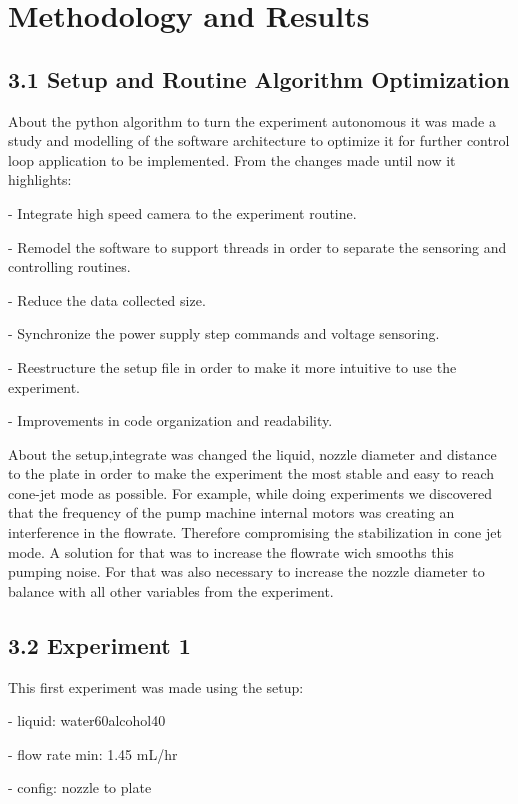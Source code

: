 \section{Methodology and Results}

\subsection*{3.1 Setup and Routine Algorithm Optimization}

    About the python algorithm to turn the experiment autonomous it was made a study and modelling of the software architecture to optimize it 
    for further control loop application to be implemented.
    From the changes made until now it highlights:

    - Integrate high speed camera to the experiment routine.

    - Remodel the software to support threads in order to separate the sensoring and controlling routines.

    - Reduce the data collected size. 

    - Synchronize the power supply step commands and voltage sensoring. 

    - Reestructure the setup file in order to make it more intuitive to use the experiment. 

    - Improvements in code organization and readability.

    About the setup,integrate was changed the liquid, nozzle diameter and distance to the plate in order to make the experiment 
    the most stable and easy to reach cone-jet mode as possible.
    For example, while doing experiments we discovered that the frequency of the pump machine internal motors was
    creating an interference in the flowrate. Therefore compromising the stabilization in cone jet mode.
    A solution for that was to increase the flowrate wich smooths this pumping noise. For that was also necessary
    to increase the nozzle diameter to balance with all other variables from the experiment.


\subsection*{3.2 Experiment 1}

    This first experiment was made using the setup:

    - liquid: water60alcohol40

    - flow rate min: 1.45 mL/hr

    - config: nozzle to plate

